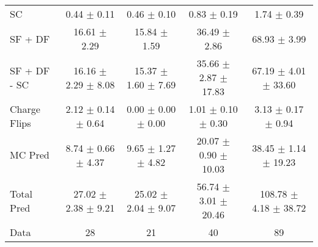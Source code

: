 \begin{tabular}{l|cccc}
                                 SC &  0.44 $\pm$  0.11 &  0.46 $\pm$  0.10 &  0.83 $\pm$  0.19 &  1.74 $\pm$  0.39 \\
                            SF + DF & 16.61 $\pm$  2.29 & 15.84 $\pm$  1.59 & 36.49 $\pm$  2.86 & 68.93 $\pm$  3.99 \\
\hline
                       SF + DF - SC & 16.16 $\pm$  2.29 $\pm$  8.08 & 15.37 $\pm$  1.60 $\pm$  7.69 & 35.66 $\pm$  2.87 $\pm$ 17.83 & 67.19 $\pm$  4.01 $\pm$ 33.60 \\
\hline\hline
                       Charge Flips &  2.12 $\pm$  0.14 $\pm$  0.64 &  0.00 $\pm$  0.00 $\pm$  0.00 &  1.01 $\pm$  0.10 $\pm$  0.30 &  3.13 $\pm$  0.17 $\pm$  0.94 \\
\hline
                            MC Pred &  8.74 $\pm$  0.66 $\pm$  4.37 &  9.65 $\pm$  1.27 $\pm$  4.82 & 20.07 $\pm$  0.90 $\pm$ 10.03 & 38.45 $\pm$  1.14 $\pm$ 19.23 \\
\hline
                         Total Pred & 27.02 $\pm$  2.38 $\pm$  9.21 & 25.02 $\pm$  2.04 $\pm$  9.07 & 56.74 $\pm$  3.01 $\pm$ 20.46 & 108.78 $\pm$  4.18 $\pm$ 38.72 \\
\hline\hline
                               Data &    28 &    21 &    40 &    89 \\
\hline\hline
\end{tabular}

